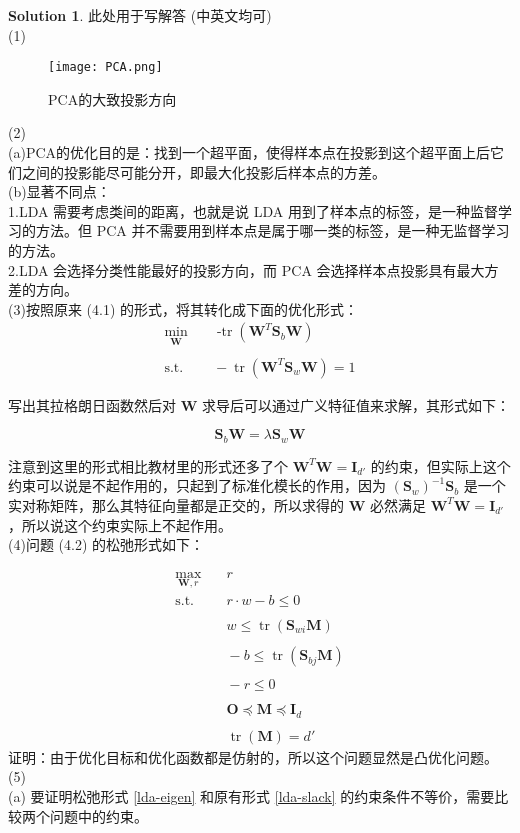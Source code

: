 \documentclass[a4paper]{article}
\numberwithin{equation}{section}
\theoremstyle{definition}
\newtheorem*{solution}{Solution}
\def \O {\mathbf{O}}
\def \I {\mathbf{I}}
\def \S {\mathbf{S}}
\def \M {\mathbf{M}}
\def \W {\mathbf{W}}
\begin{document}
\begin{solution}
此处用于写解答 (中英文均可)\\
(1)\begin{figure}[H]
  \centering
  \texttt{[image: PCA.png]}
  \caption{PCA的大致投影方向 }
  \label{fig:roc}
\end{figure}
(2)\\
(a)PCA的优化目的是：找到一个超平面，使得样本点在投影到这个超平面上后它们之间的投影能尽可能分开，即最大化投影后样本点的方差。\\
(b)显著不同点：\\
1.LDA 需要考虑类间的距离，也就是说 LDA 用到了样本点的标签，是一种监督学习的方法。但 PCA 并不需要用到样本点是属于哪一类的标签，是一种无监督学习的方法。\\
2.LDA 会选择分类性能最好的投影方向，而 PCA 会选择样本点投影具有最大方差的方向。\\
(3)按照原来 (4.1) 的形式，将其转化成下面的优化形式：
\[
\begin{aligned}
\min_{\W} & \quad \operatorname{-tr}(\W^T\S_{b}\W) \\\\\text{s.t. } & \quad - \operatorname{tr}(\W^T\S_{w}\W) = 1 
\end{aligned}
\]

写出其拉格朗日函数然后对 $\W$ 求导后可以通过广义特征值来求解，其形式如下：

\[
\S_{b}\W = \lambda \S_{w}\W
\]

注意到这里的形式相比教材里的形式还多了个 $\W^T\W = \I_{d'}$ 的约束，但实际上这个约束可以说是不起作用的，只起到了标准化模长的作用，因为 $(\S_{w})^{-1}\S_{b}$ 是一个实对称矩阵，那么其特征向量都是正交的，所以求得的 $\W$ 必然满足 $\W^T\W = \I_{d'}$，所以说这个约束实际上不起作用。\\
(4)问题 (4.2) 的松弛形式如下：

\[
\begin{aligned}
\max_{\W, r} & \quad r \\\text{s.t. } & \quad r \cdot w - b \leq 0 \\\\& \quad w \leq \operatorname{tr}(\S_{wi}\M) \\\\& \quad -b \leq \operatorname{tr}(\S_{bj}\M) \\\\& \quad -r \leq 0 \\\\& \quad \O \preceq \M \preceq \I_{d} \\\\& \quad \operatorname{tr}(\M) = d'
\end{aligned}
\]
证明：由于优化目标和优化函数都是仿射的，所以这个问题显然是凸优化问题。\\
 (5)\\
 (a) 要证明松弛形式 \eqref{lda-eigen} 和原有形式 \eqref{lda-slack} 的约束条件不等价，需要比较两个问题中的约束。


\end{solution}
\end{document}
